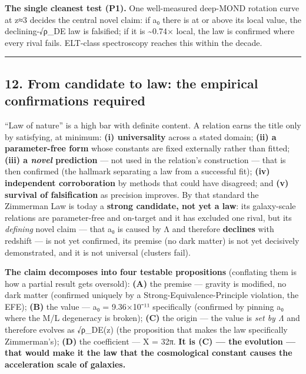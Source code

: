 \documentclass[
]{article}
\begin{document}
\textbf{The single cleanest test (P1).} One well-measured deep-MOND
rotation curve at z≈3 decides the central novel claim: if a₀ there is at
or above its local value, the declining-√ρ\_DE law is falsified; if it
is \textasciitilde0.74× local, the law is confirmed where every rival
fails. ELT-class spectroscopy reaches this within the decade.

\begin{center}\rule{0.5\linewidth}{0.5pt}\end{center}

\subsection{12. From candidate to law: the empirical confirmations
required}\label{from-candidate-to-law-the-empirical-confirmations-required}

``Law of nature'' is a high bar with definite content. A relation earns
the title only by satisfying, at minimum: \textbf{(i) universality}
across a stated domain; \textbf{(ii) a parameter-free form} whose
constants are fixed externally rather than fitted; \textbf{(iii) a
\emph{novel} prediction} --- not used in the relation's construction ---
that is then confirmed (the hallmark separating a law from a successful
fit); \textbf{(iv) independent corroboration} by methods that could have
disagreed; and \textbf{(v) survival of falsification} as precision
improves. By that standard the Zimmerman Law is today a \textbf{strong
candidate, not yet a law}: its galaxy-scale relations are parameter-free
and on-target and it has excluded one rival, but its \emph{defining}
novel claim --- that a₀ is caused by Λ and therefore \textbf{declines}
with redshift --- is not yet confirmed, its premise (no dark matter) is
not yet decisively demonstrated, and it is not universal (clusters
fail).

\textbf{The claim decomposes into four testable propositions}
(conflating them is how a partial result gets oversold): \textbf{(A)}
the premise --- gravity is modified, no dark matter (confirmed uniquely
by a Strong-Equivalence-Principle violation, the EFE); \textbf{(B)} the
value --- a₀ = 9.36×10⁻¹¹ specifically (confirmed by pinning a₀ where
the M/L degeneracy is broken); \textbf{(C)} the origin --- the value is
\emph{set by Λ} and therefore evolves as √ρ\_DE(z) (the proposition that
makes the law specifically Zimmerman's); \textbf{(D)} the coefficient
--- X = 32π. \textbf{It is (C) --- the evolution --- that would make it
the law that the cosmological constant causes the acceleration scale of
galaxies.}
\end{document}
